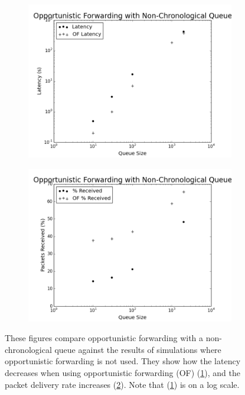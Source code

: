         \begin{figure}
            \centering
            \begin{subfigure}{\textwidth}
                \centering
                \includegraphics[width=\linewidth]{./images/OF_Complete_Latency.png}
                \caption{}
                \label{fig:of_complete_latency}
            \end{subfigure}
            \begin{subfigure}{\textwidth}
                \includegraphics[width=\linewidth]{./images/OF_Complete_Received.png}
                \caption{}
                \label{fig:of_complete_received}
            \end{subfigure}
            \caption{These figures compare opportunistic forwarding with a non-chronological queue against the results of simulations where opportunistic forwarding is not used. They show how the latency decreases when using opportunistic forwarding (OF) (\ref{fig:of_complete_latency}), and the packet delivery rate increases (\ref{fig:of_complete_received}). Note that (\ref{fig:of_complete_latency}) is on a log scale.}
            \label{fig:opportunistic_queue_good}
        \end{figure}

